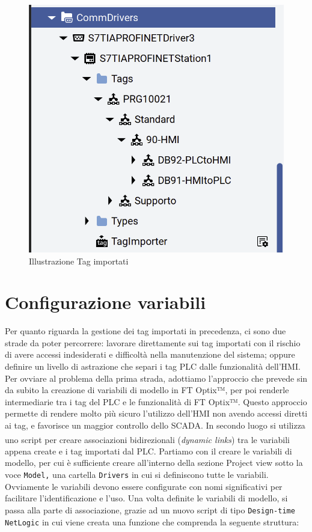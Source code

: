 \begin{figure} 
    \centering
    \includegraphics[width=0.4\linewidth]{Immagini/ImportTag.png}
    \caption{Illustrazione Tag importati}
    \label{fig:ImportTag.png}
\end{figure}

\section{Configurazione variabili}
Per quanto riguarda la gestione dei tag importati in precedenza, ci sono due strade da poter percorrere: lavorare direttamente sui tag importati con il rischio di avere accessi indesiderati e difficoltà nella manutenzione del sistema; oppure definire un livello di astrazione che separi i tag PLC dalle funzionalità dell'HMI. Per ovviare al problema della prima strada, adottiamo l'approccio che prevede sin da subito la creazione di variabili di modello in FT Optix™, per poi renderle intermediarie tra i tag del PLC e le funzionalità di FT Optix™. Questo approccio permette di rendere molto più sicuro l'utilizzo dell'HMI non avendo accessi diretti ai tag, e favorisce un maggior controllo dello SCADA. In secondo luogo si utilizza uno script per creare associazioni bidirezionali (\textit{dynamic links})\textsuperscript{\cite{factorytalk_setdynamiclink}} tra le variabili appena create e i tag importati dal PLC. Partiamo con il creare le variabili di modello, per cui è sufficiente creare all'interno della sezione Project view sotto la voce \verb|Model,| una cartella \verb|Drivers| in cui si definiscono tutte le variabili. Ovviamente le variabili devono essere configurate con nomi significativi per facilitare l'identificazione e l'uso. Una volta definite le variabili di modello, si passa alla parte di associazione, grazie ad un nuovo script di tipo \verb|Design-time NetLogic| in cui viene creata una funzione che comprenda la seguente struttura:
